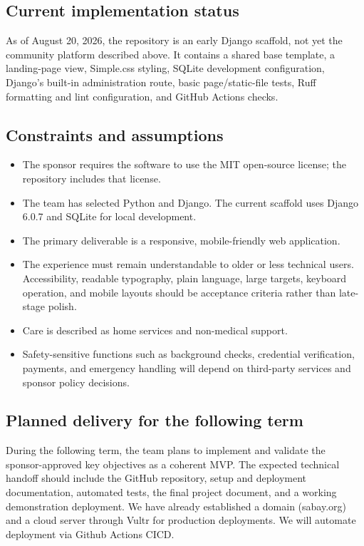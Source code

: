 \documentclass[11pt]{article}
\begin{document}
\subsection{Current implementation status}

As of August 20, 2026, the repository is an early Django scaffold, not yet the community platform described above. It contains a shared base template, a landing-page view, Simple.css styling, SQLite development configuration, Django's built-in administration route, basic page/static-file tests, Ruff formatting and lint configuration, and GitHub Actions checks.

\subsection{Constraints and assumptions}

\begin{itemize}
  \item The sponsor requires the software to use the MIT open-source license; the repository includes that license.
  \item The team has selected Python and Django. The current scaffold uses Django 6.0.7 and SQLite for local development.
  \item The primary deliverable is a responsive, mobile-friendly web application.
  \item The experience must remain understandable to older or less technical users. Accessibility, readable typography, plain language, large targets, keyboard operation, and mobile layouts should be acceptance criteria rather than late-stage polish.
  \item Care is described as home services and non-medical support.
  \item Safety-sensitive functions such as background checks, credential verification, payments, and emergency handling will depend on third-party services and sponsor policy decisions.
\end{itemize}

\subsection{Planned delivery for the following term}

During the following term, the team plans to implement and validate the sponsor-approved key objectives as a coherent MVP. The expected technical handoff should include the GitHub repository, setup and deployment documentation, automated tests, the final project document, and a working demonstration deployment. We have already established a domain (sabay.org) and a cloud server through Vultr for production deployments. We will automate deployment via Github Actions CICD.
\end{document}
